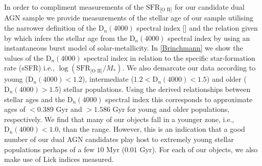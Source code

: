 In order to compliment measurements of the $\text{SFR}_{\text{[O II]}}$ for our candidate dual AGN sample we provide measurements of the stellar age of our sample utilising the narrower definition of the $\text{D}_{n}(4000)$ spectral index [\cite{Balogh_1999}] and the relation given by \cite{Kauffmann_2003} which infers the stellar age from the $\text{D}_{n}(4000)$ spectral index by using an instantaneous burst model of solar-metallicity. In \ref{Brinchmann} we show the values of the $\text{D}_{n}(4000)$ spectral index in relation to the specific star-formation rate (sSFR) i.e., $\log{(\text{SFR}_{\text{[O II]}}/M_{*})}$. We also demarcate our data according to young ($\text{D}_{n}(4000)<{1.2}$), intermediate (${1.2}<{\text{D}_{n}(4000)}<{1.5}$) and older ($\text{D}_{n}(4000)>{1.5}$) stellar populations. Using the derived relationships between stellar ages and the $\text{D}_{n}(4000)$ spectral index this corresponds to approximate ages of $<0.389$ Gyr and $>{1.586}$ Gyr for young and older populations, respectively. We find that many of our objects fall in a younger zone, i.e., $\text{D}_{n}(4000)<{1.0}$, than the \cite{Kauffmann_2003} range. However, this is an indication that a good number of our dual AGN candidates play host to extremely young stellar populations perhaps of a few $10$ Myr ($0.01$ Gyr).     
For each of our objects, we also make use of Lick indices measured.

